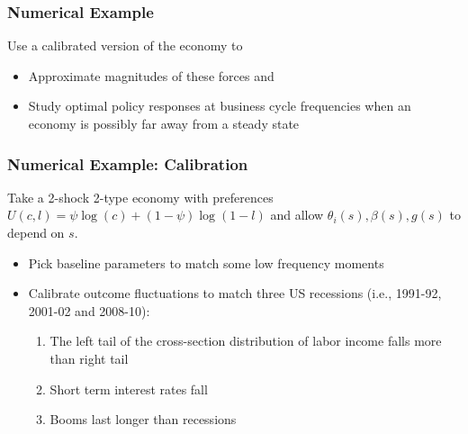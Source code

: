 \documentclass{beamer}
\begin{document}
\begin{frame}
 \frametitle{Numerical Example}

 Use a  calibrated version of the economy to
 \begin{itemize}
  \item Approximate magnitudes of these forces and
  \item Study optimal policy responses at business cycle frequencies when an economy is possibly far away from a steady state
 \end{itemize}
 \end{frame}
 \begin{frame}
 \frametitle{Numerical Example: Calibration}
Take a 2-shock 2-type economy with preferences $U(c,l)=\psi \log(c)+(1-\psi)\log(1-l)$ and allow $\theta_i(s),\beta(s),g(s)$ to depend on $s$.

 \begin{itemize}

 \item Pick  baseline parameters to match some low frequency moments

 \item Calibrate outcome fluctuations to match three US recessions (i.e., 1991-92, 2001-02 and 2008-10):

 \begin{enumerate}
  \item The left tail of the cross-section distribution of labor income falls more than right tail
  \item Short term interest rates fall
  \item Booms last longer than recessions
 \end{enumerate}

 \end{itemize}

\end{frame}
\end{document}
